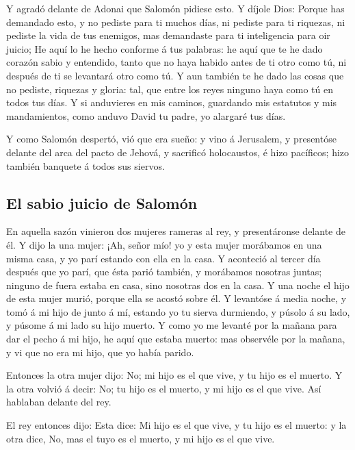  Y agradó delante de Adonai que Salomón pidiese esto.
 Y díjole Dios: Porque has demandado esto, y no pediste
para ti muchos días, ni pediste para ti riquezas, ni pediste la vida de
tus enemigos, mas demandaste para ti inteligencia para oir juicio;
 He aquí lo he hecho conforme á tus palabras: he aquí que
te he dado corazón sabio y entendido, tanto que no haya habido antes de
ti otro como tú, ni después de ti se levantará otro como tú.
 Y aun también te he dado las cosas que no pediste,
riquezas y gloria: tal, que entre los reyes ninguno haya como tú en
todos tus días.  Y si anduvieres en mis caminos, guardando
mis estatutos y mis mandamientos, como anduvo David tu padre, yo
alargaré tus días.

 Y como Salomón despertó, vió que era sueño: y vino á
Jerusalem, y presentóse delante del arca del pacto de Jehová, y
sacrificó holocaustos, é hizo pacíficos; hizo también banquete á todos
sus siervos.

\hypertarget{el-sabio-juicio-de-salomuxf3n}{%
\subsection{El sabio juicio de
Salomón}\label{el-sabio-juicio-de-salomuxf3n}}

 En aquella sazón vinieron dos mujeres rameras al rey, y
presentáronse delante de él.  Y dijo la una mujer: ¡Ah,
señor mío! yo y esta mujer morábamos en una misma casa, y yo parí
estando con ella en la casa.  Y aconteció al tercer día
después que yo parí, que ésta parió también, y morábamos nosotras
juntas; ninguno de fuera estaba en casa, sino nosotras dos en la casa.
 Y una noche el hijo de esta mujer murió, porque ella se
acostó sobre él.  Y levantóse á media noche, y tomó á mi
hijo de junto á mí, estando yo tu sierva durmiendo, y púsolo á su lado,
y púsome á mi lado su hijo muerto.  Y como yo me levanté
por la mañana para dar el pecho á mi hijo, he aquí que estaba muerto:
mas observéle por la mañana, y vi que no era mi hijo, que yo había
parido.

 Entonces la otra mujer dijo: No; mi hijo es el que vive, y
tu hijo es el muerto. Y la otra volvió á decir: No; tu hijo es el
muerto, y mi hijo es el que vive. Así hablaban delante del rey.

 El rey entonces dijo: Esta dice: Mi hijo es el que vive, y
tu hijo es el muerto: y la otra dice, No, mas el tuyo es el muerto, y mi
hijo es el que vive.

